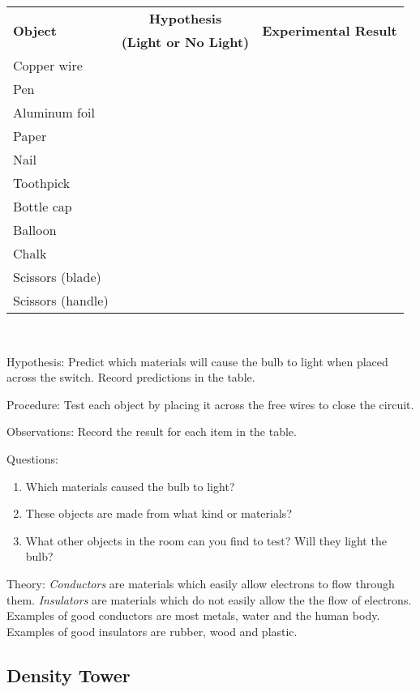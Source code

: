 \begin{description*}
{\begin{tabular}{|l|c|c|} \hline
\multirow{2}{*}{\textbf{Object}} & \textbf{Hypothesis} & \multirow{2}{*}{\textbf{Experimental Result}} \\
& \textbf{(Light or No Light)} & \\ \hline
Copper wire & & \\ \hline
Pen & & \\ \hline
Aluminum foil& & \\ \hline
Paper& & \\ \hline
Nail& & \\ \hline
Toothpick& & \\ \hline
Bottle cap& & \\ \hline
Balloon& & \\ \hline
Chalk& & \\ \hline
Scissors (blade)& & \\ \hline
Scissors (handle)& & \\ \hline
\end{tabular}\\[10pt]
}
\item[Hypothesis:]{Predict which materials will cause the bulb to light when placed across the switch. Record predictions in the table.}
\item[Procedure:]{Test each object by placing it across the free wires to close the circuit.}
\item[Observations:]{Record the result for each item in the table.}
\item[Questions:]{}\hfill 
\begin{enumerate}
\item Which materials caused the bulb to light?
\item These objects are made from what kind or materials?
\item What other objects in the room can you find to test? Will they light the bulb?
\end{enumerate}
\item[Theory:]{\emph{Conductors} are materials which easily allow electrons to flow through them. \emph{Insulators} are materials which do not easily allow the the flow of electrons. Examples of good conductors are most metals, water and the human body. Examples of good insulators are rubber, wood and plastic.}
\end{description*}

\pagebreak


\subsection{Density Tower}

